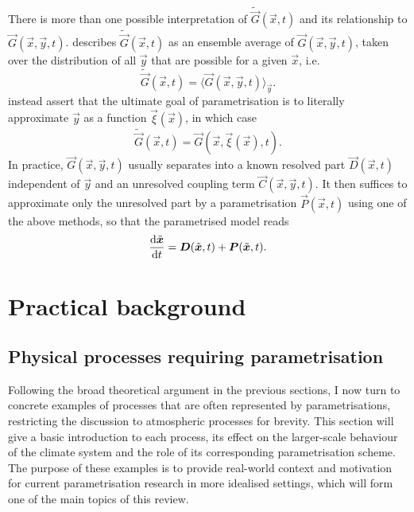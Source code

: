 \documentclass[../main.tex]{subfiles}
\begin{document}
There is more than one possible interpretation of $\tilde{\vec{G}}(\vec{x},t)$
and its relationship to $\vec{G}(\vec{x},\vec{y},t)$. \textcite{hasselmann1976}
describes $\tilde{\vec{G}}(\vec{x},t)$ as an ensemble average of
$\vec{G}(\vec{x},\vec{y},t)$, taken over the distribution of all $\vec{y}$ that
are possible for a given $\vec{x}$, i.e.
\begin{equation*}
    \tilde{\vec{G}}(\vec{x},t)
        = \langle \vec{G}(\vec{x},\vec{y},t) \rangle_{\vec{y}}.
\end{equation*}
\textcite{demaeyer2018} instead assert that the ultimate goal of
parametrisation is to literally approximate $\vec{y}$ as a function
$\vec{\xi}(\vec{x})$, in which case
\begin{equation*}
    \tilde{\vec{G}}(\vec{x},t)
        = \vec{G}(\vec{x},\vec{\xi}(\vec{x}),t).
\end{equation*}
In practice, $\vec{G}(\vec{x},\vec{y},t)$ usually separates into a known
resolved part $\vec{D}(\vec{x},t)$ independent of $\vec{y}$ and an unresolved
coupling term $\vec{C}(\vec{x},\vec{y},t)$. It then suffices to approximate
only the unresolved part by a parametrisation $\vec{P}(\vec{x}, t)$ using one
of the above methods, so that the parametrised model reads
\begin{equation} \label{eqn:parametrised_model}
    \frac{\mathrm{d} \tilde{\bm{x}}}{\mathrm{d} t}
        = \bm{D}(\tilde{\bm{x}},t) + \bm{P}(\tilde{\bm{x}}, t).
\end{equation}



\section{Practical background} \label{sec:prac_background}

\subsection{Physical processes requiring parametrisation}
Following the broad theoretical argument in the previous sections, I now turn
to concrete examples of processes that are often represented by
parametrisations, restricting the discussion to atmospheric processes for
brevity. This section will give a basic introduction to each process, its
effect on the larger-scale behaviour of the climate system and the role of its
corresponding parametrisation scheme. The purpose of these examples is to
provide real-world context and motivation for current parametrisation research
in more idealised settings, which will form one of the main topics of this
review.
\end{document}
